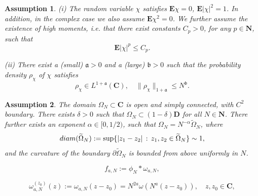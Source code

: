 \documentclass[10pt,a4paper]{amsart}
\newtheorem{assumption}{Assumption}
\newcommand{\C}{\mathbf{C}}
\newcommand{\E}{\mathbf{E}}
\newcommand{\N}{\mathbf{N}}
\begin{document}
\begin{assumption}\label{ass:chi} \emph{(i)} The random variable $\chi$ satisfies $\E \chi=0$, $\E |\chi|^2=1$. In addition, in the complex case we also assume $\E\chi^2=0$. We further assume the existence of high moments, i.e. that there exist constants $C_p>0$, for any $p\in \N$, such that  
\begin{equation}
\E |\chi|^p\le C_p.
\label{eq:momass}
\end{equation}

\noindent\emph{(ii)} There exist a (small) $\mathfrak{a}>0$ and a (large) $\mathfrak{b}>0$ such that the probability density $\rho_\chi$ of $\chi$
satisfies
\begin{equation}
\rho_\chi \in L^{1+\mathfrak{a}}(\C),\quad \|\rho_\chi\|_{1+\mathfrak{a}}\le N^\mathfrak{b}.
\label{eq:reg_ass}
\end{equation}
\end{assumption}

\begin{assumption}\label{ass:Omega} The domain $\Omega_N\subset\C$ is open and simply connected, with $C^2$ boundary. There exists $\delta>0$ such that $\Omega_N\subset (1-\delta)\mathbf{D}$ for all $N\in\N$. There further exists an exponent $\alpha\in [0,1/2)$, such that $\Omega_N=N^{-\alpha}\widetilde{\Omega}_N$, where 
\begin{equation}
{\rm{diam}}(\widetilde{\Omega}_N):=\sup \{|z_1-z_2|\,:\, z_1,z_2\in\widetilde{\Omega}_N\} \sim 1,
\label{eq:diam}
\end{equation}
and the curvature of the boundary $\partial\widetilde{\Omega}_N$ is bounded from above uniformly in $N$.
\end{assumption}

\begin{equation}
f_{a,N}:=\phi_N*\omega_{a,N},
\label{eq:def_f}
\end{equation}

\begin{equation}
\omega_{a,N}^{(z_0)}(z):=\omega_{a,N}(z-z_0) = N^{2a}\omega(N^a(z-z_0)),\quad z,z_0\in\C,
\label{eq:omega_z0}
\end{equation}
\end{document}
